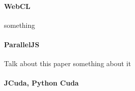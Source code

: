 
\paragraph{WebCL}
something

\paragraph{ParallelJS}
Talk about this paper \cite{parallelJS} something about it

\paragraph{JCuda, Python Cuda}

